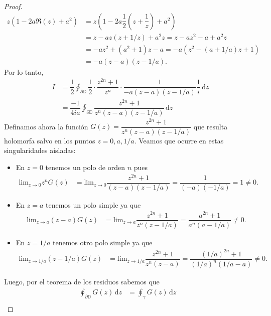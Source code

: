 \documentclass{article}
\newcommand{\D}{\mathbb{D}}
\begin{document}
\begin{proof}
\begin{align*}
        z \left( 1 - 2a \Re(z) + a^2 \right) & = z (1 - 2a \dfrac{1}{2} (z + \dfrac{1}{z}) + a^2)       \\
                                             & = z - az (z + 1/z) + a^2 z = z - a z^2 - a + a^2 z       \\
                                             & = - a z^2 + (a^2 + 1) z - a = -a (z^2 - (a + 1/a) z + 1) \\
                                             & = -a (z - a)(z - 1/a).
    \end{align*}
    Por lo tanto, \begin{align*}
        I & = \dfrac{1}{2} \oint_{\partial \D} \dfrac{1}{2} \cdot \dfrac{z^{2n} + 1}{z^n} \cdot \dfrac{1}{-a (z-a)(z-1/a)} \dfrac{1}{i} \, \mathrm{d}z \\
          & = \dfrac{-1}{4ia} \oint_{\partial \D} \dfrac{z^{2n}+1}{z^n (z-a)(z-1/a)} \, \mathrm{d}z
    \end{align*}
    Definamos ahora la función \( G(z) = \dfrac{z^{2n}+ 1}{z^n (z-a)(z-1/a)} \) que resulta holomorfa salvo en los puntos \( z = 0, a, 1/a \). Veamos que ocurre en estas singularidades aisladas:
    \begin{itemize}
        \item En \( z = 0 \) tenemos un polo de orden \( n \) pues \begin{align*}
                  \text{lim}_{z \to 0} z^n G(z) & = \text{lim}_{z \to 0} \dfrac{z^{2n} + 1}{(z - a)(z - 1/a)} = \dfrac{1}{(-a)(-1/a)} = 1 \neq 0.
              \end{align*}
        \item En \( z = a \) tenemos un polo simple ya que \begin{align*}
                  \text{lim}_{z \to a} (z-a) G(z) & = \text{lim}_{z \to a} \dfrac{z^{2n} + 1}{z^n (z - 1/a)} = \dfrac{a^{2n} + 1}{a^n (a - 1/a)} \neq 0.
              \end{align*}
        \item En \( z = 1/a \) tenemos otro polo simple ya que \begin{align*}
                  \text{lim}_{z \to 1/a} (z - 1/a) G(z) & = \text{lim}_{z \to 1/a} \dfrac{z^{2n} + 1}{z^n (z - a)} = \dfrac{{(1/a)}^{2n} + 1}{{(1/a)}^n (1/a - a)} \neq 0.
              \end{align*}
    \end{itemize}
    Luego, por el teorema de los residuos sabemos que \begin{align*}
        \oint_{\partial \D} G(z) \, \mathrm{d}z & = \oint_{\gamma} G(z) \, \mathrm{d}z                                                                                                                            & \\

\end{align*}
\end{proof}
\end{document}
